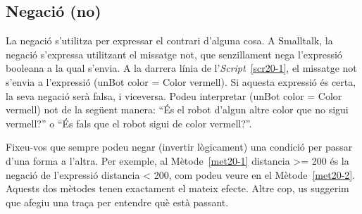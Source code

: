 \subsection{Negació (no)}

La negació s'utilitza per expressar el contrari d'alguna cosa. A Smalltalk, la negació s'expressa utilitzant el missatge \textsf{not}, que senzillament nega l'expressió booleana a la qual s'envia. A la darrera línia de l'\emph{Script}~\ref{scr20-1}, el missatge \textsf{not} s'envia a l'expressió \textsf{(unBot color = Color vermell)}. Si aquesta expressió és certa, la seva negació serà falsa, i viceversa. Podeu interpretar \textsf{(unBot color = Color vermell) not} de la següent manera: ``És el robot d'algun altre color que no sigui vermell?'' o ``És fals que el robot sigui de color vermell?''.

Fixeu-vos que sempre podeu negar (invertir lògicament) una condició per passar d'una forma a l'altra. Per exemple, al Mètode~\ref{met20-1} \textsf{distancia \textgreater= 200} és la negació de l'expressió \textsf{distancia \textless \hspace*{1mm} 200}, com podeu veure en el Mètode~\ref{met20-2}. Aquests dos mètodes tenen exactament el mateix efecte. Altre cop, us suggerim que afegiu una traça per entendre què està passant.


